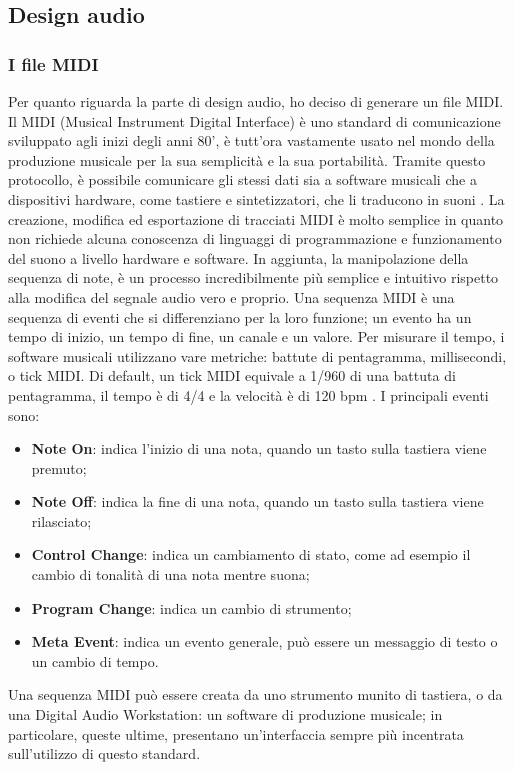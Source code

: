 \subsection{Design audio}
\subsubsection{I file MIDI}
Per quanto riguarda la parte di design audio, ho deciso di generare un file MIDI.
Il MIDI (Musical Instrument Digital Interface) è uno standard di comunicazione sviluppato agli inizi degli anni 80', è tutt'ora vastamente usato nel mondo della produzione musicale per la sua semplicità e la sua portabilità.
Tramite questo protocollo, è possibile comunicare gli stessi dati sia a software musicali che a dispositivi hardware, come tastiere e sintetizzatori, che li traducono in suoni \cite{midi}.
La creazione, modifica ed esportazione di tracciati MIDI è molto semplice in quanto non richiede alcuna conoscenza di linguaggi di programmazione e funzionamento del suono a livello hardware e software.
In aggiunta, la manipolazione della sequenza di note, è un processo incredibilmente più semplice e intuitivo rispetto alla modifica del segnale audio vero e proprio.
Una sequenza MIDI è una sequenza di eventi che si differenziano per la loro funzione; un evento ha un tempo di inizio, un tempo di fine, un canale e un valore.
Per misurare il tempo, i software musicali utilizzano vare metriche: battute di pentagramma, millisecondi, o tick MIDI.
Di default, un tick MIDI equivale a 1/960 di una battuta di pentagramma, il tempo è di 4/4 e la velocità è di 120 bpm \cite{midi}.
I principali eventi sono:
\begin{itemize}
    \item \textbf{Note On}: indica l'inizio di una nota, quando un tasto sulla tastiera viene premuto;
    \item \textbf{Note Off}: indica la fine di una nota, quando un tasto sulla tastiera viene rilasciato;
    \item \textbf{Control Change}: indica un cambiamento di stato, come ad esempio il cambio di tonalità di una nota mentre suona;
    \item \textbf{Program Change}: indica un cambio di strumento;
    \item \textbf{Meta Event}: indica un evento generale, può essere un messaggio di testo o un cambio di tempo.
\end{itemize}
Una sequenza MIDI può essere creata da uno strumento munito di tastiera, o da una Digital Audio Workstation: un software di produzione musicale; in particolare, queste ultime, presentano un'interfaccia sempre più incentrata sull'utilizzo di questo standard.
